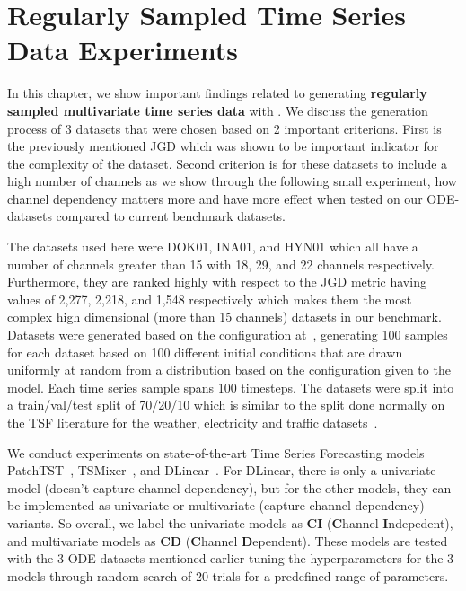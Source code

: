 \section{Regularly Sampled Time Series Data Experiments}\label{app:regular}

In this chapter, we show important findings related to generating \textbf{regularly sampled multivariate time series data} with \Bench. 
We discuss the generation process of 3 datasets that were chosen based on 2 important criterions.
First is the previously mentioned JGD which was shown to be important indicator for the complexity of the dataset. 
Second criterion is for these datasets to include a high number of channels as we show through the following small experiment, how channel dependency matters more and have more effect when tested on our ODE-datasets compared to current benchmark datasets.

The datasets used here were DOK01, INA01, and HYN01 which all have a number of channels greater than 15 with 18, 29, and 22 channels respectively. 
Furthermore, they are ranked highly with respect to the JGD metric having values of 2,277, 2,218, and 1,548 respectively which makes them the most complex high dimensional (more than 15 channels) datasets in our benchmark.
Datasets were generated based on the configuration at~, generating 100 samples for each dataset based on 100 different initial conditions that are drawn uniformly at random from a distribution based on the configuration given to the model.
Each time series sample spans 100 timesteps. 
The datasets were split into a train/val/test split of 70/20/10 which is similar to the split done normally on the TSF literature for the weather, electricity and traffic datasets~\citep{Chen2023.TSMixerb, Zeng2023.Are, Nie2023.Time}.   

We conduct experiments on state-of-the-art Time Series Forecasting models PatchTST~\citep{Nie2023.Time}, TSMixer~\citep{Chen2023.TSMixerb}, and DLinear~\citep{Zeng2023.Are}. 
For DLinear, there is only a univariate model (doesn't capture channel dependency), but for the other models, they can be implemented as univariate or multivariate (capture channel dependency) variants.
So overall, we label the univariate models as \textbf{CI} (\textbf{C}hannel \textbf{I}ndepedent), and multivariate models as \textbf{CD} (\textbf{C}hannel \textbf{D}ependent). 
These models are tested with the 3 ODE datasets mentioned earlier tuning the hyperparameters for the 3 models through random search of 20 trials for a predefined range of parameters.

